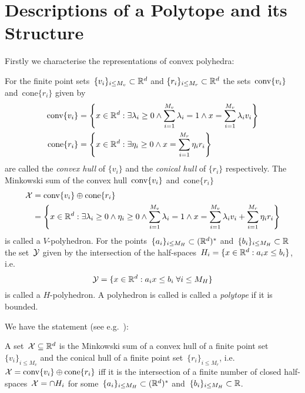 \section{Descriptions of a Polytope and its Structure}\label{ch:concepts:sec:polytopes:descriptions}
%
%
\mysplit Firstly we characterise the representations of convex polyhedra:
%
\begin{defi}
For the finite point sets~$\{v_i\}_{i\leq M_v}\subset\mathbb R^d$ and $\{r_i\}_{i\leq M_r}\subset\mathbb R^d$ the sets~$\text{conv}\{v_i\}$ and~$\text{cone}\{r_i\}$ given by
%
\begin{equation}\begin{aligned}
	\text{conv}\{v_i\} &= \left\{x\in\mathbb R^d:\exists\lambda_i\geq0\wedge\sum_{i=1}^{M_v}\lambda_i=1\wedge x=\sum_{i=1}^{M_v}\lambda_iv_i\right\}\\
	\text{cone}\{r_i\} &= \left\{x\in\mathbb R^d:\exists \eta_i\geq0\wedge x=\sum_{i=1}^{M_r}\eta_i r_i\right\}
\end{aligned}\end{equation}
%
are called the \emph{convex hull} of $\{v_i\}$ and the \emph{conical hull} of $\{r_i\}$ respectively.
%
The Minkowski sum of the convex hull~$\text{conv}\{v_i\}$ and~$\text{cone}\{r_i\}$
%
\begin{equation}\begin{aligned}
	\mathcal X &= \text{conv}\{v_i\}\oplus\text{cone}\{r_i\}\\
	&=\left\{x\in\mathbb R^d:\exists\lambda_i\geq0\wedge\eta_i\geq0\wedge\sum_{i=1}^{M_v}\lambda_i=1\wedge x=\sum_{i=1}^{M_v}\lambda_i v_i+\sum_{i=1}^{M_r}\eta_i r_i\right\}
\end{aligned}\end{equation}
%
is called a $V$-polyhedron.
%
%
For the points~$\{a_i\}_{i\leq M_H}\subset(\mathbb R^d)^\ast$ and~$\{b_i\}_{i\leq M_H}\subset\mathbb R$ the set~$\mathcal Y$ given by the intersection of the half-spaces~$H_i = \{x\in\mathbb R^d:a_i x\leq b_i\}$, i.e.
%
\begin{equation}
	\mathcal Y=\{x\in\mathbb R^d: a_i x\leq b_i\;\forall i\leq M_H\}
\end{equation}
%
is called a $H$-polyhedron.
%
A polyhedron is called is called a \emph{polytope} if it is bounded.
\end{defi}
%
\noindent We have the statement (see e.g.~\cite{Ziegler:1995}):
%
\begin{thm}
A set~$\mathcal X\subseteq\mathbb R^d$ is the Minkowski sum of a convex hull of a finite point set~$\{v_i\}_{i\leq M_v}$ and the conical hull of a finite point set~$\{r_i\}_{i\leq M_r}$, i.e.~$\mathcal X=\text{conv}\{v_i\}\oplus\text{cone}\{r_i\}$ iff it is the  intersection of a finite number of closed half-spaces~$\mathcal X=\cap H_i$ for some~$\{a_i\}_{i\leq M_H}\subset(\mathbb R^d)^\ast$ and~$\{b_i\}_{i\leq M_H}\subset\mathbb R$.
\end{thm}
